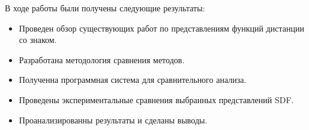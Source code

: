 \documentclass[a4paper,hidelinks,12pt]{article}
\begin{document}
В ходе работы были получены следующие результаты:

\begin{itemize}
	\item Проведен обзор существующих работ по представлениям функций дистанции со знаком.
	\item Разработана методология сравнения методов.
	\item Полученна программная система для сравнительного анализа.
	\item Проведены экспериментальные сравнения выбранных представлений SDF.
	\item Проанализированны результаты и сделаны выводы.
\end{itemize}

\newpage



\end{document}
